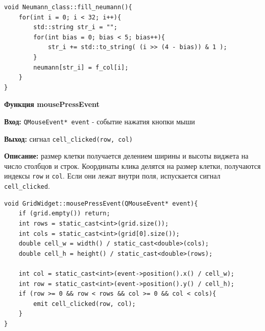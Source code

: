 \newpage

\begin{lstlisting}[caption=fill\_neumann, label=lst:fill-neumann]
void Neumann_class::fill_neumann(){
    for(int i = 0; i < 32; i++){
        std::string str_i = "";
        for(int bias = 0; bias < 5; bias++){
            str_i += std::to_string( (i >> (4 - bias)) & 1 );
        }
        neumann[str_i] = f_col[i];
    }
}
\end{lstlisting}



 \par

\vspace{-8pt}

\textbf{Функция mousePressEvent} \par
\textbf{Вход:} \texttt{QMouseEvent* event} - событие нажатия кнопки мыши \par
\textbf{Выход:} сигнал \texttt{cell\_clicked(row, col)} \par
\textbf{Описание:} размер клетки получается делением ширины и высоты виджета на число столбцов и строк. Координаты клика делятся на размер клетки, получаются индексы \texttt{row} и \texttt{col}. Если они лежат внутри поля, испускается сигнал \texttt{cell\_clicked}.\par

\begin{lstlisting}[caption=mousePressEvent, label=lst:mouse]
void GridWidget::mousePressEvent(QMouseEvent* event){
    if (grid.empty()) return;
    int rows = static_cast<int>(grid.size());
    int cols = static_cast<int>(grid[0].size());
    double cell_w = width() / static_cast<double>(cols);
    double cell_h = height() / static_cast<double>(rows);

    int col = static_cast<int>(event->position().x() / cell_w);
    int row = static_cast<int>(event->position().y() / cell_h);
    if (row >= 0 && row < rows && col >= 0 && col < cols){
        emit cell_clicked(row, col);
    }
}
\end{lstlisting}


 \par

